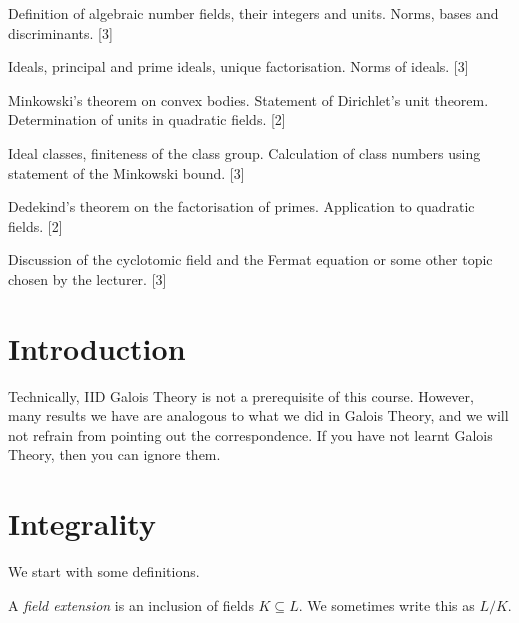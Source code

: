 \documentclass[a4paper]{article}
\begin{document}
\maketitle
{\small
\noindent Definition of algebraic number fields, their integers and units. Norms, bases and discriminants.\hspace*{\fill} [3]

\vspace{5pt}
\noindent Ideals, principal and prime ideals, unique factorisation. Norms of ideals.\hspace*{\fill} [3]

\vspace{5pt}
\noindent Minkowski's theorem on convex bodies. Statement of Dirichlet's unit theorem. Determination of units in quadratic fields.\hspace*{\fill} [2]

\vspace{5pt}
\noindent Ideal classes, finiteness of the class group. Calculation of class numbers using statement of the Minkowski bound.\hspace*{\fill} [3]

\vspace{5pt}
\noindent Dedekind's theorem on the factorisation of primes. Application to quadratic fields.\hspace*{\fill} [2]

\vspace{5pt}
\noindent Discussion of the cyclotomic field and the Fermat equation or some other topic chosen by the lecturer.\hspace*{\fill} [3]}

\tableofcontents
\setcounter{section}{-1}
\section{Introduction}
Technically, IID Galois Theory is not a prerequisite of this course. However, many results we have are analogous to what we did in Galois Theory, and we will not refrain from pointing out the correspondence. If you have not learnt Galois Theory, then you can ignore them.

\section{Integrality}
We start with some definitions.

\begin{defi}
  A \emph{field extension} is an inclusion of fields $K \subseteq L$. We sometimes write this as $L/K$.
\end{defi}
\end{document}
